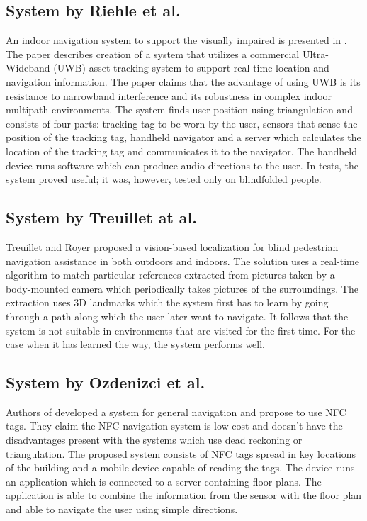 \subsection{System by Riehle et al.}
An indoor navigation system to support the visually impaired is presented in \cite{riehle}. The paper describes creation of a system that utilizes a commercial Ultra-Wideband (UWB) asset tracking system to support real-time location and navigation information. The paper claims that the advantage of using UWB is its resistance to narrowband interference and its robustness in complex indoor multipath environments. The system finds user position using triangulation and consists of four parts: tracking tag to be worn by the user, sensors that sense the position of the tracking tag, handheld navigator and a server which calculates the location of the tracking tag and communicates it to the navigator. The handheld device runs software which can produce audio directions to the user. In tests, the system proved useful; it was, however, tested only on blindfolded people.

\subsection{System by Treuillet at al.}
Treuillet and Royer \cite{sylvie} proposed a vision-based localization for blind pedestrian navigation assistance in both outdoors and indoors. The solution uses a real-time algorithm to match particular references extracted from pictures taken by a body-mounted camera which periodically takes pictures of the surroundings. The extraction uses 3D landmarks which the system first has to learn by going through a path along which the user later want to navigate. It follows that the system is not suitable in environments that are visited for the first time. For the case when it has learned the way, the system performs well.

\subsection{System by Ozdenizci et al.}
Authors of \cite{indoorNFC} developed a system for general navigation and propose to use NFC tags. They claim the NFC navigation system is low cost and doesn't have the disadvantages present with the systems which use dead reckoning or triangulation. The proposed system consists of NFC tags spread in key locations of the building and a mobile device capable of reading the tags. The device runs an application which is connected to a server containing floor plans. The application is able to combine the information from the sensor with the floor plan and able to navigate the user using simple directions.

